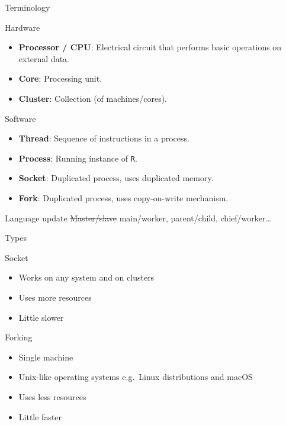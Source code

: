 \documentclass[
  ignorenonframetext,
  usenames,
  dvipsnames]{beamer}
\providecommand{\tightlist}{%
  \setlength{\itemsep}{0pt}\setlength{\parskip}{0pt}}
\begin{document}
\begin{frame}[fragile]{Terminology}
\protect\hypertarget{terminology}{}
\begin{block}{Hardware}
\protect\hypertarget{hardware-1}{}
\begin{itemize}
\tightlist
\item
  \textbf{Processor / CPU}: Electrical circuit that performs basic
  operations on external data.
\item
  \textbf{Core}: Processing unit.
\item
  \textbf{Cluster}: Collection (of machines/cores).
\end{itemize}
\end{block}

\begin{block}{Software}
\protect\hypertarget{software-1}{}
\begin{itemize}
\tightlist
\item
  \textbf{Thread}: Sequence of instructions in a process.
\item
  \textbf{Process}: Running instance of \texttt{R}.
\item
  \textbf{Socket}: Duplicated process, uses duplicated memory.
\item
  \textbf{Fork}: Duplicated process, uses copy-on-write mechanism.
\end{itemize}
\end{block}

\begin{block}{Language update}
\protect\hypertarget{language-update}{}
\sout{Master/slave} main/worker, parent/child, chief/worker\ldots{}
\end{block}
\end{frame}

\begin{frame}{Types}
\protect\hypertarget{types}{}
\begin{block}{Socket}
\protect\hypertarget{socket}{}
\begin{itemize}
\tightlist
\item
  Works on any system and on clusters
\item
  Uses more resources
\item
  Little slower
\end{itemize}
\end{block}

\begin{block}{Forking}
\protect\hypertarget{forking}{}
\begin{itemize}
\tightlist
\item
  Single machine
\item
  Unix-like operating systems e.g.~Linux distributions and macOS
\item
  Uses less resources
\item
  Little faster
\end{itemize}
\end{block}
\end{frame}
\end{document}
